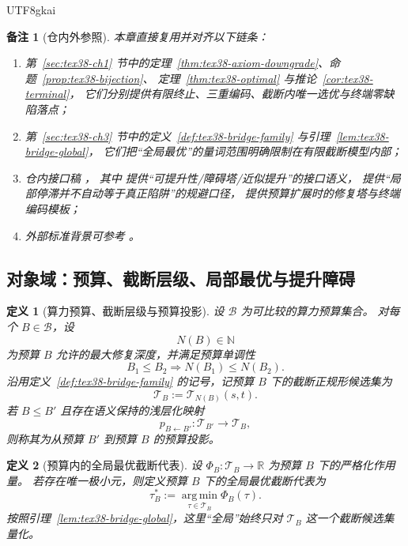 \documentclass[12pt]{article}
\newtheorem{definition}{定义}[section]
\newtheorem{remark}{备注}[section]
\newcommand{\NN}{\mathbb{N}}
\newcommand{\RR}{\mathbb{R}}
\begin{document}
\begin{CJK*}{UTF8}{gkai}
\begin{remark}[仓内外参照]
本章直接复用并对齐以下链条：
\begin{enumerate}
  \item 第~\ref{sec:tex38-ch1} 节中的定理~\ref{thm:tex38-axiom-downgrade}、命题~\ref{prop:tex38-bijection}、
  定理~\ref{thm:tex38-optimal} 与推论~\ref{cor:tex38-terminal}，
  它们分别提供有限终止、三重编码、截断内唯一选优与终端零缺陷落点；
  \item 第~\ref{sec:tex38-ch3} 节中的定义~\ref{def:tex38-bridge-family} 与引理~\ref{lem:tex38-bridge-global}，
  它们把“全局最优”的量词范围明确限制在有限截断模型内部；
  \item 仓内接口稿 \cite{RepoTex22DiscussionGains,RepoTex29TransfiniteRepair,RepoTex31RepairTower,
    RepoTex32ConditionalConvergence,RepoTex36HomotopyTwistBijection,RepoTex6JacobiGap,GaoZheng2025GFramework}，
  其中 \cite{RepoTex22DiscussionGains,RepoTex32ConditionalConvergence} 提供“可提升性/障碍塔/近似提升”的接口语义，
  \cite{RepoTex29TransfiniteRepair} 提供“局部停滞并不自动等于真正陷阱”的规避口径，
  \cite{RepoTex31RepairTower,RepoTex36HomotopyTwistBijection} 提供预算扩展时的修复塔与终端编码模板；
  \item 外部标准背景可参考 \cite{Hatcher2002AT,Whitehead1978Elements,Weibel1994HomologicalAlgebra,
    LodayVallette2012AlgebraicOperads}。
\end{enumerate}
\end{remark}

\subsection{对象域：预算、截断层级、局部最优与提升障碍}
\label{subsec:tex38-budget-objects}

\begin{definition}[算力预算、截断层级与预算投影]
\label{def:tex38-budget-truncation}
设 $\mathcal B$ 为可比较的算力预算集合。
对每个 $B\in\mathcal B$，设
\[
  N(B)\in\NN
\]
为预算 $B$ 允许的最大修复深度，并满足预算单调性
\[
  B_1\le B_2
  \Longrightarrow
  N(B_1)\le N(B_2).
\]
沿用定义~\ref{def:tex38-bridge-family} 的记号，记预算 $B$ 下的截断正规形候选集为
\[
  \mathcal T_B:=\mathcal T_{N(B)}(s,t).
\]
若 $B\le B'$ 且存在语义保持的浅层化映射
\[
  p_{B\leftarrow B'}:\mathcal T_{B'}\to \mathcal T_B,
\]
则称其为从预算 $B'$ 到预算 $B$ 的\emph{预算投影}。
\end{definition}

\begin{definition}[预算内的全局最优截断代表]
\label{def:tex38-budget-global-opt}
设 $\Phi_B:\mathcal T_B\to\RR$ 为预算 $B$ 下的严格化作用量。
若存在唯一极小元，则定义预算 $B$ 下的\emph{全局最优截断代表}为
\[
  \tau_B^\ast
  :=
  \operatorname*{arg\,min}_{\tau\in\mathcal T_B}\Phi_B(\tau).
\]
按照引理~\ref{lem:tex38-bridge-global}，这里“全局”始终只对 $\mathcal T_B$ 这一个截断候选集量化。
\end{definition}


\end{CJK*}
\end{document}
